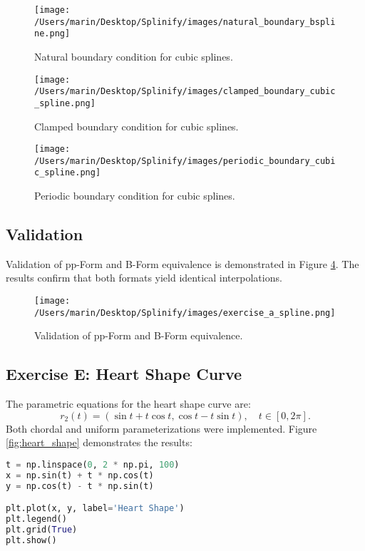 \documentclass[11pt,a4paper]{article}
\begin{document}
\begin{figure}[h!]
    \centering
    \texttt{[image: /Users/marin/Desktop/Splinify/images/natural\_boundary\_bspline.png]}
    \caption{Natural boundary condition for cubic splines.}
    \label{fig:natural_cubic}
\end{figure}

\begin{figure}[h!]
    \centering
    \texttt{[image: /Users/marin/Desktop/Splinify/images/clamped\_boundary\_cubic\_spline.png]}
    \caption{Clamped boundary condition for cubic splines.}
    \label{fig:clamped_cubic}
\end{figure}

\begin{figure}[h!]
    \centering
    \texttt{[image: /Users/marin/Desktop/Splinify/images/periodic\_boundary\_cubic\_spline.png]}
    \caption{Periodic boundary condition for cubic splines.}
    \label{fig:periodic_cubic}
\end{figure}

\subsection{Validation}
Validation of pp-Form and B-Form equivalence is demonstrated in Figure \ref{fig:validation}. The results confirm that both formats yield identical interpolations.

\begin{figure}[h!]
    \centering
    \texttt{[image: /Users/marin/Desktop/Splinify/images/exercise\_a\_spline.png]}
    \caption{Validation of pp-Form and B-Form equivalence.}
    \label{fig:validation}
\end{figure}

\subsection{Exercise E: Heart Shape Curve}
The parametric equations for the heart shape curve are:
\[
r_2(t) = (\sin t + t \cos t, \cos t - t \sin t), \quad t \in [0, 2\pi].
\]
Both chordal and uniform parameterizations were implemented. Figure \ref{fig:heart_shape} demonstrates the results:
\begin{lstlisting}[language=Python, caption=Heart Shape Implementation]
t = np.linspace(0, 2 * np.pi, 100)
x = np.sin(t) + t * np.cos(t)
y = np.cos(t) - t * np.sin(t)

plt.plot(x, y, label='Heart Shape')
plt.legend()
plt.grid(True)
plt.show()
\end{lstlisting}
\end{document}
